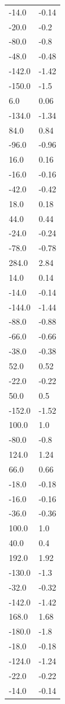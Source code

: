 \begin{longtable}{ll}
-14.0 & -0.14 \\
-20.0 & -0.2 \\
-80.0 & -0.8 \\
-48.0 & -0.48 \\
-142.0 & -1.42 \\
-150.0 & -1.5 \\
6.0 & 0.06 \\
-134.0 & -1.34 \\
84.0 & 0.84 \\
-96.0 & -0.96 \\
16.0 & 0.16 \\
-16.0 & -0.16 \\
-42.0 & -0.42 \\
18.0 & 0.18 \\
44.0 & 0.44 \\
-24.0 & -0.24 \\
-78.0 & -0.78 \\
284.0 & 2.84 \\
14.0 & 0.14 \\
-14.0 & -0.14 \\
-144.0 & -1.44 \\
-88.0 & -0.88 \\
-66.0 & -0.66 \\
-38.0 & -0.38 \\
52.0 & 0.52 \\
-22.0 & -0.22 \\
50.0 & 0.5 \\
-152.0 & -1.52 \\
100.0 & 1.0 \\
-80.0 & -0.8 \\
124.0 & 1.24 \\
66.0 & 0.66 \\
-18.0 & -0.18 \\
-16.0 & -0.16 \\
-36.0 & -0.36 \\
100.0 & 1.0 \\
40.0 & 0.4 \\
192.0 & 1.92 \\
-130.0 & -1.3 \\
-32.0 & -0.32 \\
-142.0 & -1.42 \\
168.0 & 1.68 \\
-180.0 & -1.8 \\
-18.0 & -0.18 \\
-124.0 & -1.24 \\
-22.0 & -0.22 \\
-14.0 & -0.14 \\

\end{longtable}
